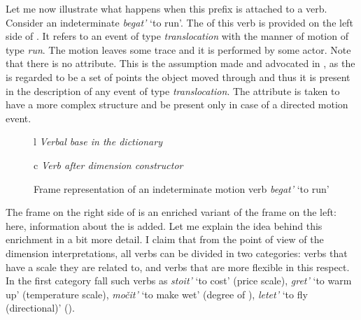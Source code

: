 Let me now illustrate what happens when this prefix is attached to a verb. Consider an indeterminate  \textit{begat'} `to run'. The  of this verb is provided on the left side of . It refers to an event of type \textit{translocation} with the manner of motion of type \textit{run}. The motion leaves some trace and it is performed by some actor. Note that there is no \PATH attribute. This is the assumption made and advocated in \citealt{ZinovaOsswald:paper}, as the \TRACE is regarded to be a set of points the object moved through and thus it is present in the description of any event of type \textit{translocation}. The \PATH attribute is taken to have a more complex structure and be present only in case of a directed motion event.

\begin{figure}
\begin{tabular}[t]{l}
\textit{Verbal base in the dictionary}\\
\end{tabular}
\hfill
\begin{tabular}[t]{c}
\textit{Verb after dimension constructor}\\
\end{tabular}
\caption{Frame representation of an indeterminate motion verb \textit{begat'} `to run' \label{frame:begat}}
\end{figure}

The frame on the right side of  is an enriched variant of the frame on the left: here, information about the  is added. Let me explain the idea behind this enrichment in a bit more detail. I claim that from the point of view of the dimension interpretations, all verbs can be divided in two categories: verbs that have a scale they are related to, and verbs that are more flexible in this respect. In the first category fall such verbs as \textit{stoit'} `to cost' (price scale), \textit{gret'} `to warm up' (temperature scale), \textit{mo\v{c}it'} `to make wet' (degree of ), \textit{letet'} `to fly (directional)' (). 

